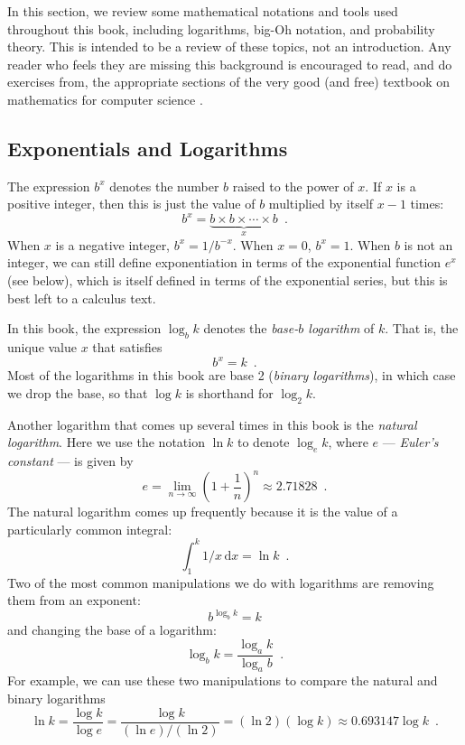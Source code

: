 In this section, we review some mathematical notations and tools
used throughout this book, including logarithms, big-Oh notation, and
probability theory.  This is intended to be a review of these topics, not
an introduction.  Any reader who feels they are missing this background
is encouraged to read, and do exercises from, the appropriate sections
of the very good (and free) textbook on mathematics for computer science
\cite{llm11}.

\subsection{Exponentials and Logarithms}

The expression $b^x$ denotes the number $b$ raised to the power of $x$.
If $x$ is a positive integer, then this is just the value of $b$
multiplied by itself $x-1$ times:
\[
    b^x = \underbrace{b\times b\times \cdots \times b}_{x} \enspace .
\]
When $x$ is a negative integer, $b^x=1/b^{-x}$.  When $x=0$, $b^x=1$.
When $b$ is not an integer, we can still define exponentiation in terms
of the exponential function $e^x$ (see below), which is itself defined in
terms of the exponential series, but this is best left to a calculus text.

In this book, the expression $\log_b k$ denotes the \emph{base-$b$ logarithm}
of $k$.  That is, the unique value $x$ that satisfies
\[
    b^{x} = k  \enspace .
\]
Most of the logarithms in this book are base 2 (\emph{binary logarithms}),
in which case we drop the base, so that $\log k$ is shorthand for
$\log_2 k$.

Another logarithm that comes up several times in this book is the
\emph{natural logarithm}.  Here we use the notation $\ln k$ to denote
$\log_e k$, where $e$ --- \emph{Euler's constant} --- is given by
\[
   e = \lim_{n\rightarrow\infty} \left(1+\frac{1}{n}\right)^n
   \approx  2.71828 \enspace .
\]
The natural logarithm comes up frequently because it is the value
of a particularly common integral:
\[
    \int_{1}^{k} 1/x\,\mathrm{d}x  = \ln k \enspace .
\]
Two of the most common manipulations we do with logarithms are removing
them from an exponent:
\[
    b^{\log_b k} = k
\]
and changing the base of a logarithm:
\[
    \log_b k = \frac{\log_a k}{\log_a b} \enspace .
\]
For example, we can use these two manipulations to compare the natural and binary logarithms
\[
   \ln k = \frac{\log k}{\log e} = \frac{\log k}{(\ln e)/(\ln 2)} = 
    (\ln 2)(\log k) \approx 0.693147\log k \enspace .
\]

